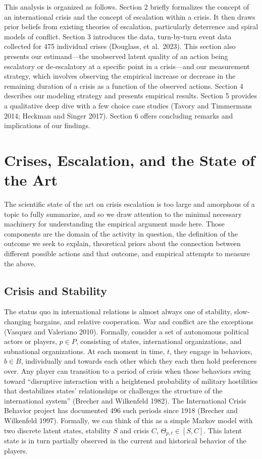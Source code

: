 \documentclass[
]{article}
\begin{document}
This analysis is organized as follows. Section 2 briefly formalizes the
concept of an international crisis and the concept of escalation within
a crisis. It then draws prior beliefs from existing theories of
escalation, particularly deterrence and spiral models of conflict.
Section 3 introduces the data, turn-by-turn event data collected for 475
individual crises (Douglass, et al.~2023). This section also presents
our estimand---the unobserved latent quality of an action being
escalatory or de-escalatory at a specific point in a crisis---and our
measurement strategy, which involves observing the empirical increase or
decrease in the remaining duration of a crisis as a function of the
observed actions. Section 4 describes our modeling strategy and presents
empirical results. Section 5 provides a qualitative deep dive with a few
choice case studies (Tavory and Timmermans 2014; Heckman and Singer
2017). Section 6 offers concluding remarks and implications of our
findings.

\section{Crises, Escalation, and the State of the
Art}\label{crises-escalation-and-the-state-of-the-art}

The scientific state of the art on crisis escalation is too large and
amorphous of a topic to fully summarize, and so we draw attention to the
minimal necessary machinery for understanding the empirical argument
made here. Those components are the domain of the activity in question,
the definition of the outcome we seek to explain, theoretical priors
about the connection between different possible actions and that
outcome, and empirical attempts to measure the above.

\subsection{Crisis and Stability}\label{crisis-and-stability}

The status quo in international relations is almost always one of
stability, slow-changing bargains, and relative cooperation. War and
conflict are the exceptions (Vasquez and Valeriano 2010). Formally,
consider a set of autonomous political actors or players, \(p\in P\),
consisting of states, international organizations, and subnational
organizations. At each moment in time, \(t\), they engage in behaviors,
\(b\in B\), individually and towards each other which they each then
hold preferences over. Any player can transition to a period of crisis
when those behaviors swing toward ``disruptive interaction with a
heightened probability of military hostilities that destabilizes states'
relationships or challenges the structure of the international system''
(Brecher and Wilkenfeld 1982). The International Crisis Behavior project
has documented 496 such periods since 1918 (Brecher and Wilkenfeld
1997). Formally, we can think of this as a simple Markov model with two
discrete latent states, stability \(S\) and crisis \(C\),
\(\Theta_{p,t}\in[S,C]\). This latent state is in turn partially
observed in the current and historical behavior of the players.
\end{document}
